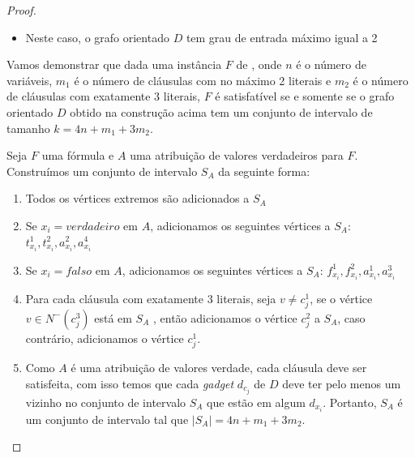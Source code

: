 \begin{theorem}
\begin{proof}
\begin{itemize}

        \item Neste caso, o grafo orientado $D$ tem grau de entrada máximo igual a 2
    \end{itemize}

Vamos demonstrar que dada uma instância $F$ de \sam, onde $n$ é o número de variáveis, $m_1$ é o número de cláusulas com no máximo 2 literais e $m_2$ é o número de cláusulas com exatamente 3 literais, $F$ é satisfatível se e somente se o grafo orientado $D$ obtido na construção acima tem um conjunto de intervalo \pd de tamanho $k = 4n + m_1 + 3m_2$.

Seja $F$ uma fórmula \sam e $A$ uma atribuição de valores verdadeiros para $F$. Construímos um conjunto de intervalo $S_A$ da seguinte forma:

\begin{enumerate}
    \item Todos os vértices extremos são adicionados a $S_A$
    \item Se $x_i = verdadeiro$ em $A$, adicionamos os seguintes vértices a $S_A$: $t^1_{x_i}, t^2_{x_i}, a^2_{x_i}, a^4_{x_i}$
    \item Se $x_i = falso$ em $A$, adicionamos os seguintes vértices a $S_A$: $f^1_{x_i}, f^2_{x_i}, a^1_{x_i}, a^3_{x_i}$
    \item Para cada cláusula com exatamente 3 literais, seja $v \neq c^1_j$, se o vértice $v \in N^-(c^3_j)$ está em $S_A$ , então adicionamos o vértice $c^2_j$ a $S_A$, caso contrário, adicionamos o vértice $c^1_j$.
    \item Como $A$ é uma atribuição de valores verdade, cada cláusula deve ser satisfeita, com isso temos que cada \emph{gadget} $d_{c_j}$ de $D$ deve ter pelo menos um vizinho no conjunto de intervalo $S_A$ que estão em algum $d_{x_i}$. Portanto, $S_A$ é um conjunto de intervalo tal que $|S_A| = 4n+m_1+3m_2$.
\end{enumerate}


\end{proof}
\end{theorem}
